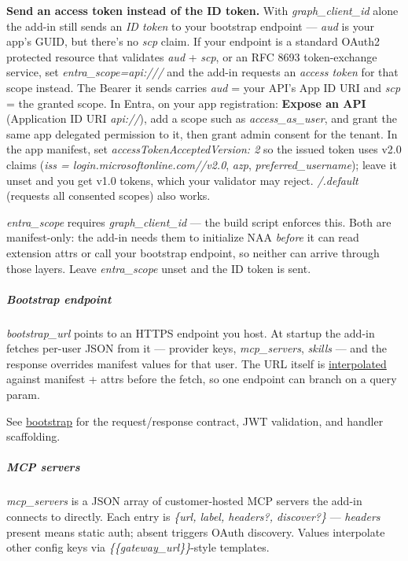 \documentclass[11pt]{article}
\begin{document}
\textbf{Send an access token instead of the ID token.} With \emph{graph\_\allowbreak{}client\_\allowbreak{}id} alone the add-in still sends an \emph{ID token} to your bootstrap endpoint — \emph{aud} is your app's GUID, but there's no \emph{scp} claim. If your endpoint is a standard OAuth2 protected resource that validates \emph{aud} + \emph{scp}, or an RFC 8693 token-exchange service, set \emph{entra\_\allowbreak{}scope=api:///} and the add-in requests an \emph{access token} for that scope instead. The Bearer it sends carries \emph{aud} = your API's App ID URI and \emph{scp} = the granted scope. In Entra, on your app registration: \textbf{Expose an API} (Application ID URI \emph{api://}), add a scope such as \emph{access\_\allowbreak{}as\_\allowbreak{}user}, and grant the same app delegated permission to it, then grant admin consent for the tenant. In the app manifest, set \emph{accessTokenAcceptedVersion: 2} so the issued token uses v2.0 claims (\emph{iss = login.microsoftonline.com//v2.0}, \emph{azp}, \emph{preferred\_\allowbreak{}username}); leave it unset and you get v1.0 tokens, which your validator may reject. \emph{/.default} (requests all consented scopes) also works.


\emph{entra\_\allowbreak{}scope} requires \emph{graph\_\allowbreak{}client\_\allowbreak{}id} — the build script enforces this. Both are manifest-only: the add-in needs them to initialize NAA \emph{before} it can read extension attrs or call your bootstrap endpoint, so neither can arrive through those layers. Leave \emph{entra\_\allowbreak{}scope} unset and the ID token is sent.


\subparagraph{Bootstrap endpoint}\mbox{}\par

\emph{bootstrap\_\allowbreak{}url} points to an HTTPS endpoint you host. At startup the add-in fetches per-user JSON from it — provider keys, \emph{mcp\_\allowbreak{}servers}, \emph{skills} — and the response overrides manifest values for that user. The URL itself is \href{bootstrap.md\#template-interpolation}{interpolated} against manifest + attrs before the fetch, so one endpoint can branch on a query param.


See \href{bootstrap.md}{bootstrap} for the request/response contract, JWT validation, and handler scaffolding.


\subparagraph{MCP servers}\mbox{}\par

\emph{mcp\_\allowbreak{}servers} is a JSON array of customer-hosted MCP servers the add-in connects to directly. Each entry is \emph{\{url, label, headers?, discover?\}} — \emph{headers} present means static auth; absent triggers OAuth discovery. Values interpolate other config keys via \emph{\{\{gateway\_\allowbreak{}url\}\}}-style templates.
\end{document}
